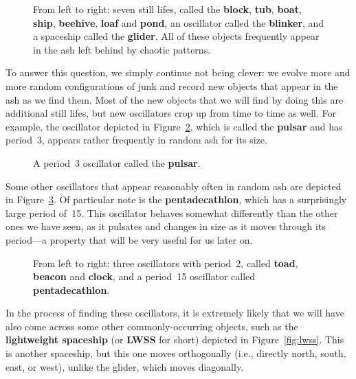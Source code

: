 \begin{figure}[!htb]
	\centering{}
	\caption{From left to right: seven still lifes, called the \textbf{block}, \textbf{tub}, \textbf{boat}, \textbf{ship}, \textbf{beehive}, \textbf{loaf} and \textbf{pond}, an oscillator called the \textbf{blinker}, and a spaceship called the \textbf{glider}. All of these objects frequently appear in the ash left behind by chaotic patterns.}\label{fig:first_objects}
\end{figure}

To answer this question, we simply continue not being clever: we evolve more and more random configurations of junk and record new objects that appear in the ash as we find them. Most of the new objects that we will find by doing this are additional still lifes, but new oscillators crop up from time to time as well. For example, the oscillator depicted in Figure~\ref{fig:pulsar}, which is called the \textbf{pulsar} and has period~$3$, appears rather frequently in random ash for its size.

\begin{figure}[!htb]
	\centering
	\caption{A period~3 oscillator called the \textbf{pulsar}.}\label{fig:pulsar}
\end{figure}

Some other oscillators that appear reasonably often in random ash are depicted in Figure~\ref{fig:random_oscillators}. Of particular note is the \textbf{pentadecathlon}, which has a surprisingly large period of~15. This oscillator behaves somewhat differently than the other ones we have seen, as it pulsates and changes in size as it moves through its period---a property that will be very useful for us later on.

\begin{figure}[!htb]
	\centering{}
	\caption{From left to right: three oscillators with period~2, called \textbf{toad}, \textbf{beacon} and \textbf{clock}, and a period~15 oscillator called \textbf{pentadecathlon}.}\label{fig:random_oscillators}
\end{figure}

In the process of finding these oscillators, it is extremely likely that we will have also come across some other commonly-occurring objects, such as the \textbf{lightweight spaceship} (or \textbf{LWSS} for short) depicted in Figure~\ref{fig:lwss}. This is another spaceship, but this one moves orthogonally (i.e., directly north, south, east, or west), unlike the glider, which moves diagonally.

